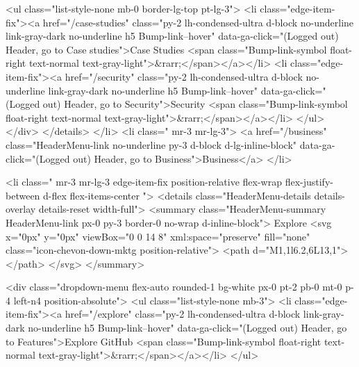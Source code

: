                     <ul class="list-style-none mb-0 border-lg-top pt-lg-3">
                      <li class="edge-item-fix"><a href="/case-studies" class="py-2 lh-condensed-ultra d-block no-underline link-gray-dark no-underline h5 Bump-link--hover" data-ga-click="(Logged out) Header, go to Case studies">Case Studies <span class="Bump-link-symbol float-right text-normal text-gray-light">&rarr;</span></a></li>
                      <li class="edge-item-fix"><a href="/security" class="py-2 lh-condensed-ultra d-block no-underline link-gray-dark no-underline h5 Bump-link--hover" data-ga-click="(Logged out) Header, go to Security">Security <span class="Bump-link-symbol float-right text-normal text-gray-light">&rarr;</span></a></li>
                    </ul>
                  </div>
                </details>
              </li>
              <li class=" mr-3 mr-lg-3">
                <a href="/business" class="HeaderMenu-link no-underline py-3 d-block d-lg-inline-block" data-ga-click="(Logged out) Header, go to Business">Business</a>
              </li>

              <li class=" mr-3 mr-lg-3 edge-item-fix position-relative flex-wrap flex-justify-between d-flex flex-items-center ">
                <details class="HeaderMenu-details details-overlay details-reset width-full">
                  <summary class="HeaderMenu-summary HeaderMenu-link px-0 py-3 border-0 no-wrap  d-inline-block">
                    Explore
                    <svg x="0px" y="0px" viewBox="0 0 14 8" xml:space="preserve" fill="none" class="icon-chevon-down-mktg position-relative">
                      <path d="M1,1l6.2,6L13,1"></path>
                    </svg>
                  </summary>

                  <div class="dropdown-menu flex-auto rounded-1 bg-white px-0 pt-2 pb-0 mt-0  p-4 left-n4 position-absolute">
                    <ul class="list-style-none mb-3">
                      <li class="edge-item-fix"><a href="/explore" class="py-2 lh-condensed-ultra d-block link-gray-dark no-underline h5 Bump-link--hover" data-ga-click="(Logged out) Header, go to Features">Explore GitHub <span class="Bump-link-symbol float-right text-normal text-gray-light">&rarr;</span></a></li>
                    </ul>

